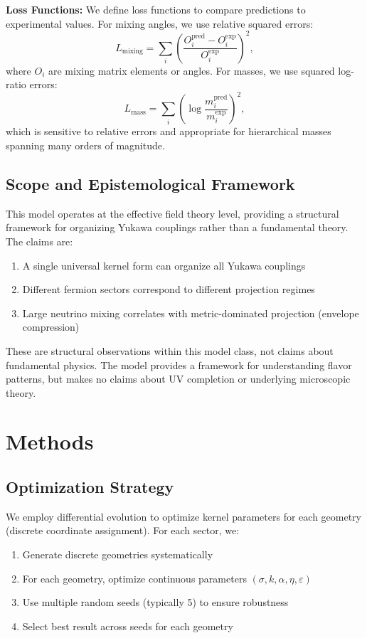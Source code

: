 \documentclass[12pt,a4paper]{article}
\begin{document}
\textbf{Loss Functions:} We define loss functions to compare predictions to experimental values. For mixing angles, we use relative squared errors:
\begin{equation}
L_{\text{mixing}} = \sum_{i} \left(\frac{O_i^{\text{pred}} - O_i^{\text{exp}}}{O_i^{\text{exp}}}\right)^2,
\end{equation}
where $O_i$ are mixing matrix elements or angles. For masses, we use squared log-ratio errors:
\begin{equation}
L_{\text{mass}} = \sum_{i} \left(\log\frac{m_i^{\text{pred}}}{m_i^{\text{exp}}}\right)^2,
\end{equation}
which is sensitive to relative errors and appropriate for hierarchical masses spanning many orders of magnitude.

\subsection{Scope and Epistemological Framework}

This model operates at the effective field theory level, providing a structural framework for organizing Yukawa couplings rather than a fundamental theory. The claims are:
\begin{enumerate}
\item A single universal kernel form can organize all Yukawa couplings
\item Different fermion sectors correspond to different projection regimes
\item Large neutrino mixing correlates with metric-dominated projection (envelope compression)
\end{enumerate}

These are structural observations within this model class, not claims about fundamental physics. The model provides a framework for understanding flavor patterns, but makes no claims about UV completion or underlying microscopic theory.

\section{Methods}

\subsection{Optimization Strategy}

We employ differential evolution \citep{Storn1997} to optimize kernel parameters for each geometry (discrete coordinate assignment). For each sector, we:
\begin{enumerate}
\item Generate discrete geometries systematically
\item For each geometry, optimize continuous parameters $(\sigma, k, \alpha, \eta, \varepsilon)$
\item Use multiple random seeds (typically 5) to ensure robustness
\item Select best result across seeds for each geometry
\end{enumerate}
\end{document}
